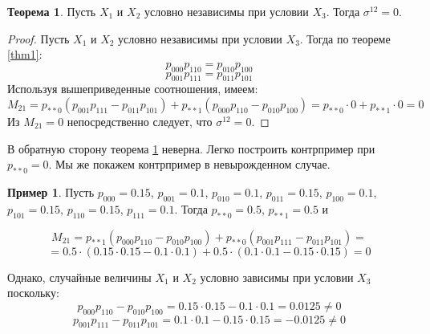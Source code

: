 \documentclass{article}
\theoremstyle{definition}
\newtheorem{theorem}{Теорема}[section]
\newtheorem{example}{Пример}[section]
\begin{document}
\begin{theorem}\label{1.2}
    Пусть $X_1$ и $X_2$ условно независимы при условии $X_3$. Тогда $\sigma^{12}=0$.
\end{theorem}
\begin{proof}
    Пусть $X_1$ и $X_2$ условно независимы при условии $X_3$. Тогда по теореме \ref{thm1}:
    $$p_{000}p_{110}=p_{010}p_{100}$$
    $$p_{001}p_{111}=p_{011}p_{101}$$
    Используя вышеприведенные соотношения, имеем:
    $$
        M_{21} = p_{**0}(p_{001}p_{111}-p_{011}p_{101}) + p_{**1} (p_{000}p_{110}-p_{010}p_{100})=p_{**0}\cdot 0 + p_{**1} \cdot 0 = 0
    $$
    Из $M_{21}=0$ непосредственно следует, что $\sigma^{12}=0$.
\end{proof}
В обратную сторону теорема \ref{1.2} неверна. Легко построить контрпример при $p_{**0}=0$. Мы же покажем контрпример в невырожденном случае.
\begin{example}
    Пусть $p_{000}=0.15$, $p_{001}=0.1$, $p_{010}=0.1$, $p_{011}=0.15$, $p_{100}=0.1$, $p_{101}=0.15$, $p_{110}=0.15$, $p_{111}=0.1$.
    Тогда $p_{**0}=0.5$, $p_{**1}=0.5$ и

    $$M_{21} = p_{**1}(p_{000}p_{110}-p_{010}p_{100}) + p_{**0}(p_{001}p_{111}-p_{011}p_{101})=$$
    $$= 0.5 \cdot (0.15 \cdot 0.15 - 0.1 \cdot 0.1) + 0.5 \cdot (0.1 \cdot 0.1 - 0.15 \cdot 0.15) = 0$$

    Однако, случайные величины $X_1$ и $X_2$ условно зависимы при условии $X_3$ поскольку:
    $$
        p_{000}p_{110}-p_{010}p_{100}=0.15 \cdot 0.15 - 0.1 \cdot 0.1 = 0.0125 \neq 0
    $$
    $$
        p_{001}p_{111}-p_{011}p_{101}=0.1 \cdot 0.1 - 0.15 \cdot 0.15 = -0.0125 \neq 0
    $$

\end{example}
\end{document}
